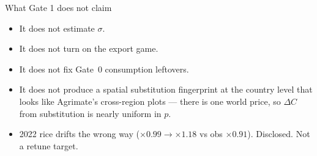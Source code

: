 \begin{frame}{What Gate 1 does not claim}
\begin{itemize}
\item It does not estimate $\sigma$.
\item It does not turn on the export game.
\item It does not fix Gate~0 consumption leftovers.
\item It does not produce a spatial substitution fingerprint at the
      country level that looks like Agrimate's cross-region plots ---
      there is one world price, so $\Delta C$ from substitution is nearly
      uniform in $p$.
\item 2022 rice drifts the wrong way ($\times 0.99\to\times 1.18$ vs obs
      $\times 0.91$). Disclosed. Not a retune target.
\end{itemize}
\end{frame}

